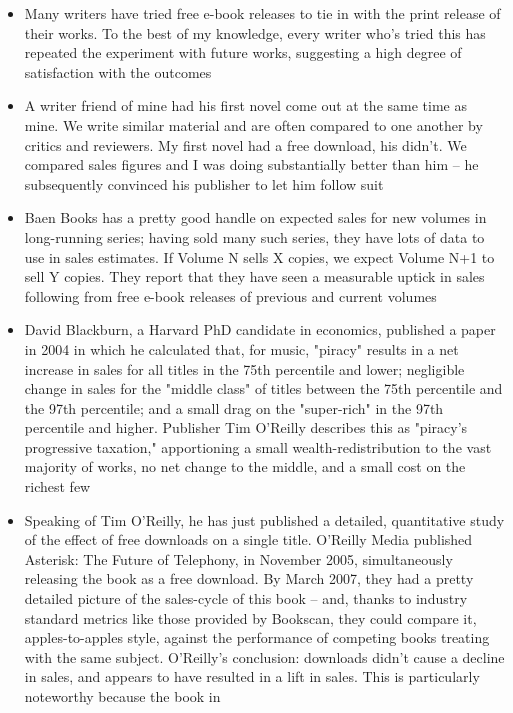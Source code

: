 \begin{itemize}
\item
  Many writers have tried free e-book releases to tie in with the
  print release of their works. To the best of my knowledge, every
  writer who's tried this has repeated the experiment with future
  works, suggesting a high degree of satisfaction with the outcomes
\item
  A writer friend of mine had his first novel come out at the same
  time as mine. We write similar material and are often compared to
  one another by critics and reviewers. My first novel had a free
  download, his didn't. We compared sales figures and I was doing
  substantially better than him -- he subsequently convinced his
  publisher to let him follow suit
\item
  Baen Books has a pretty good handle on expected sales for new
  volumes in long-running series; having sold many such series, they
  have lots of data to use in sales estimates. If Volume N sells X
  copies, we expect Volume N+1 to sell Y copies. They report that
  they have seen a measurable uptick in sales following from free
  e-book releases of previous and current volumes
\item
  David Blackburn, a Harvard PhD candidate in economics, published a
  paper in 2004 in which he calculated that, for music, "piracy"
  results in a net increase in sales for all titles in the 75th
  percentile and lower; negligible change in sales for the "middle
  class" of titles between the 75th percentile and the 97th
  percentile; and a small drag on the "super-rich" in the 97th
  percentile and higher. Publisher Tim O'Reilly describes this as
  "piracy's progressive taxation," apportioning a small
  wealth-redistribution to the vast majority of works, no net change
  to the middle, and a small cost on the richest few
\item
  Speaking of Tim O'Reilly, he has just published a detailed,
  quantitative study of the effect of free downloads on a single
  title. O'Reilly Media published Asterisk: The Future of Telephony,
  in November 2005, simultaneously releasing the book as a free
  download. By March 2007, they had a pretty detailed picture of the
  sales-cycle of this book -- and, thanks to industry standard
  metrics like those provided by Bookscan, they could compare it,
  apples-to-apples style, against the performance of competing books
  treating with the same subject. O'Reilly's conclusion: downloads
  didn't cause a decline in sales, and appears to have resulted in a
  lift in sales. This is particularly noteworthy because the book in

\end{itemize}
